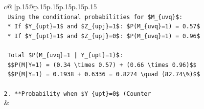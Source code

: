 \documentclass{article}
\begin{document}
{\begin{supertabular}{c@{$\;$}|p{.15\linewidth}@{}p{.15\linewidth}p{.15\linewidth}p{.15\linewidth}p{.15\linewidth}p{.15\linewidth}}
{{{\\ 
\texttt{    Using the conditional probabilities for \$M\_\{uvq\}\$:} \\
\texttt{    *   If \$Y\_\{upt\}=1\$ and \$Z\_\{upj\}=1\$: \$P(M\_\{uvq\}=1) = 0.57\$} \\
\texttt{    *   If \$Y\_\{upt\}=1\$ and \$Z\_\{upj\}=0\$: \$P(M\_\{uvq\}=1) = 0.96\$} \\
\\ 
\texttt{    Total \$P(M\_\{uvq\}=1 | Y\_\{upt\}=1)\$:} \\
\texttt{    \$\$P(M|Y=1) = (0.34 \textbackslash{}times 0.57) + (0.66 \textbackslash{}times 0.96)\$\$} \\
\texttt{    \$\$P(M|Y=1) = 0.1938 + 0.6336 = 0.8274 \textbackslash{}quad (82.74\textbackslash{}\%)\$\$} \\
\\ 
\texttt{2.  **Probability when \$Y\_\{upt\}=0\$ (Counter} \\
            }
        }
    }
    & \\ \\


\end{supertabular}}
\end{document}
